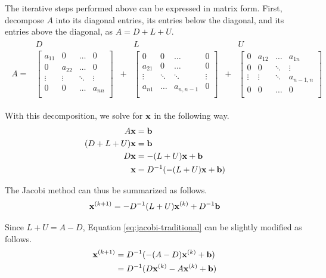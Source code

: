 The iterative steps performed above can be expressed in matrix form.
First, decompose $A$ into its diagonal entries, its entries below the diagonal, and its entries above the diagonal, as $A = D + L + U$.
\begin{align*}
\begin{array}{cccccc}
    & D & & L & & U \\
    A = &
    \left[\begin{array}{cccc}
        a_{11} & 0 & \ldots & 0 \\
        0 & a_{22} & \ldots & 0 \\
        \vdots & \vdots & \ddots & \vdots \\
        0 & 0 & \ldots & a_{nn} \\
    \end{array}\right]
    & + &
    \left[\begin{array}{cccc}
    0 & 0 & \ldots & 0 \\
    a_{21} &  0 & \ldots & 0\\
     \vdots & \ddots & \ddots & \vdots \\
    a_{n1} & \ldots & a_{n,n-1} & 0 \\
    \end{array}\right]
    & + &
    \begin{bmatrix}
    0 & a_{12} & \ldots & a_{1n} \\
    0 & 0 & \ddots & \vdots \\
     \vdots & \vdots & \ddots & a_{n-1,n} \\
    0 & 0 & \ldots & 0 \\
    \end{bmatrix}
\end{array}
\end{align*}

With this decomposition, we solve for $\mathbf{x}$ in the following way.
\begin{align*}
A\mathbf{x} &= \mathbf{b}\\
(D + L + U)\mathbf{x} &= \mathbf{b}\\
D\mathbf{x} &= -(L+U)\mathbf{x} + \mathbf{b}\\
\mathbf{x} &= D^{-1}(-(L+U)\mathbf{x} + \mathbf{b})
\end{align*}

The Jacobi method can thus be summarized as follows.
\begin{equation}
\mathbf{x}^{(k+1)} = - D^{-1}(L+U)\mathbf{x}^{(k)} + D^{-1}\mathbf{b}
\label{eq:jacobi-traditional}
\end{equation}

Since $L+U=A-D$, Equation \ref{eq:jacobi-traditional} can be slightly modified as follows.
\begin{align}
\nonumber \mathbf{x}^{(k+1)} &= D^{-1}(-(A-D)\mathbf{x}^{(k)} + \mathbf{b}) \\
&= D^{-1}(D\mathbf{x}^{(k)} - A\mathbf{x}^{(k)}  + \mathbf{b})
\label{eq:jacobi-method}
\end{align}

